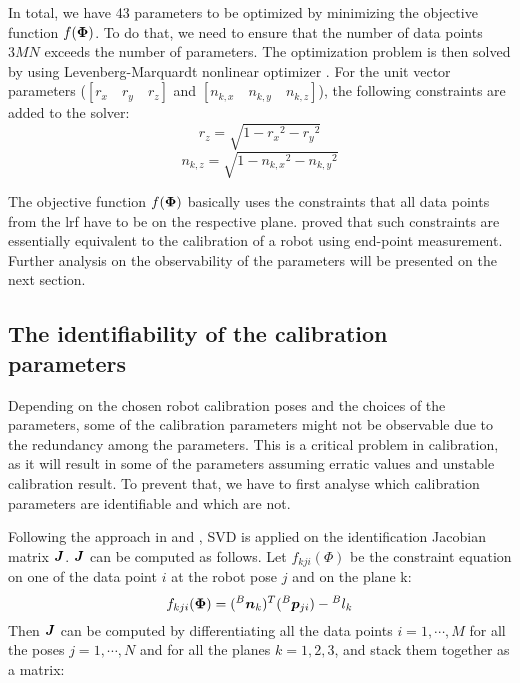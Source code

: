 In total, we have 43 parameters to be optimized by minimizing the objective function $f(\vb*{\Phi})$. To do that, we need to ensure that the number of data points $3MN$ exceeds the number of parameters. The optimization problem is then solved by using Levenberg-Marquardt nonlinear optimizer \cite{Newville2014}. For the unit vector parameters ($[r_x \quad r_y \quad r_z ]$ and  $[n_{k,x} \quad n_{k,y} \quad n_{k,z}]$), the following constraints are added to the solver:
\begin{equation}
\label{eq:10}
{r_z} = \sqrt{1 - {r_x}^2 - {r_y}^2}
\end{equation}
\begin{equation}
\label{eq:11}
n_{k,z} = \sqrt{1 - {n_{k,x}}^2 - {n_{k,y}}^2}
\end{equation}


The objective function $f(\vb*{\Phi})$ basically uses the constraints that all data points from the \ac{lrf} have to be on the respective plane. \cite{Zhuang1999} proved that such constraints are essentially equivalent to the calibration of a robot using end-point measurement. Further analysis on the observability of the parameters will be presented on the next section. 

\subsection{The identifiability of the calibration parameters}
\label{sec:third_step}

Depending on the chosen robot calibration poses and the choices of the parameters, some of the calibration parameters might not be observable due to the redundancy among the parameters. This is a critical problem in calibration, as it will result in some of the parameters assuming erratic values and unstable calibration result. To prevent that, we have to first analyse which calibration parameters are identifiable and which are not. 

Following the approach in \cite{Hollerbach1996} and \cite{Joubair2015}, SVD is applied on the identification Jacobian matrix $\vb*{J}$. $\vb*{J}$ can be computed as follows. Let  $f_{kji}(\Phi)$ be the constraint equation on one of the data point $i$ at the robot pose $j$ and on the plane k:
\begin{equation}
 f_{kji}(\vb*{\Phi}) =  ({^B}\vb*{n}_k) ^T ({^B}\vb*{p}_{ji}) - {^B}l_k
\end{equation}
Then $\vb*{J}$ can be computed by differentiating all the data points $i = 1, \cdots, M$ for all the poses $j = 1, \cdots, N$ and for all the planes $k=1,2,3$, and stack them together as a matrix:


